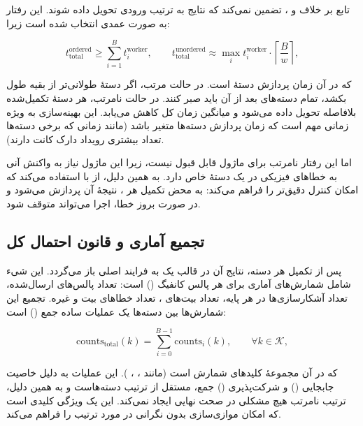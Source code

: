 تابع  بر خلاف  و ، تضمین نمی‌کند که نتایج به ترتیب ورودی تحویل داده شوند. این رفتار به صورت عمدی انتخاب شده است زیرا:

\begin{equation}
	t_{\text{total}}^{\text{ordered}} \ge \sum_{i=1}^{B} t_i^{\text{worker}}, \qquad t_{\text{total}}^{\text{unordered}} \approx \max_{i} t_i^{\text{worker}} \cdot \left\lceil \frac{B}{w} \right\rceil,
\end{equation}

\noindent که در آن  زمان پردازش دستۀ  است. در حالت مرتب، اگر دستۀ  طولانی‌تر از بقیه طول بکشد، تمام دسته‌های بعد از آن باید صبر کنند. در حالت نامرتب، هر دستۀ تکمیل‌شده بلافاصله تحویل داده می‌شود و میانگین زمان کل کاهش می‌یابد. این بهینه‌سازی به ویژه زمانی مهم است که زمان پردازش دسته‌ها متغیر باشد (مانند زمانی که برخی دسته‌ها تعداد بیشتری رویداد دارک کانت دارند).

اما این رفتار نامرتب برای ماژول  قابل قبول نیست، زیرا این ماژول نیاز به واکنش آنی به خطاهای فیزیکی در یک دستۀ خاص دارد. به همین دلیل،  از  با  استفاده می‌کند که امکان کنترل دقیق‌تر را فراهم می‌کند: به محض تکمیل هر ، نتیجۀ آن پردازش می‌شود و در صورت بروز خطا، اجرا می‌تواند متوقف شود.

\subsection{تجمیع آماری و قانون احتمال کل}

پس از تکمیل هر دسته، نتایج آن در قالب یک  به فرایند اصلی باز می‌گردد. این شیء شامل شمارش‌های آماری برای هر پالس کانفیگ () است: تعداد پالس‌های ارسال‌شده، تعداد آشکارسازی‌ها در هر پایه، تعداد بیت‌های ، تعداد خطاهای بیت و غیره. تجمیع این شمارش‌ها بین دسته‌ها یک عملیات ساده جمع () است:

\begin{equation}
	\text{counts}_{\text{total}}(k) = \sum_{i=0}^{B-1} \text{counts}_i(k), \qquad \forall k \in \mathcal{K},
\end{equation}

\noindent که در آن  مجموعۀ کلیدهای شمارش است (مانند ، ، ). این عملیات به دلیل خاصیت جابجایی () و شرکت‌پذیری () جمع، مستقل از ترتیب دسته‌هاست و به همین دلیل، ترتیب نامرتب  هیچ مشکلی در صحت نهایی ایجاد نمی‌کند. این یک ویژگی کلیدی است که امکان موازی‌سازی بدون نگرانی در مورد ترتیب را فراهم می‌کند.

